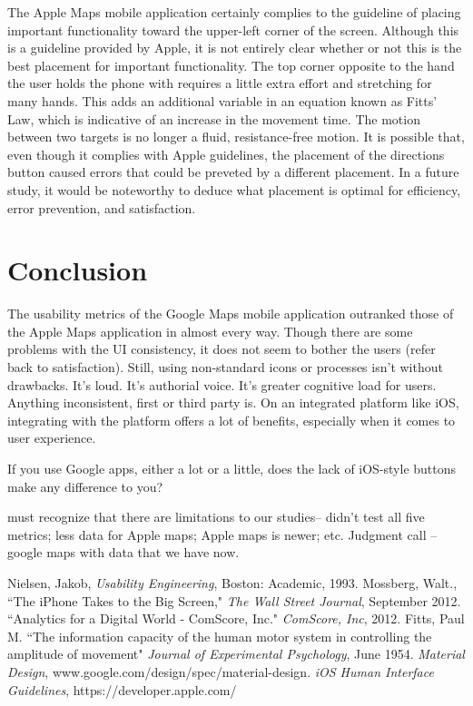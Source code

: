 \documentclass[a4paper; 11pt]{article}
\begin{document}
\par
The Apple Maps mobile application certainly complies to the guideline of placing important functionality toward the upper-left corner of the screen. Although this is a guideline provided by Apple, it is not entirely clear whether or not this is the best placement for important functionality. The top corner opposite to the hand the user holds the phone with requires a little extra effort and stretching for many hands. This adds an additional variable in an equation known as Fitts' Law\cite{Fitts}, which is indicative of an increase in the movement time. The motion between two targets is no longer a fluid, resistance-free motion. It is possible that, even though it complies with Apple guidelines, the placement of the directions button caused errors that could be preveted by a different placement. In a future study, it would be noteworthy to deduce what placement is optimal for efficiency, error prevention, and satisfaction.
\clearpage
\section{Conclusion}
The usability metrics of the Google Maps mobile application outranked those of the Apple Maps application in almost every way. Though there are some problems with the UI consistency, it does not seem to bother the users (refer back to satisfaction). Still, using non-standard icons or processes isn't without drawbacks. It's loud. It's authorial voice. It's greater cognitive load for users. Anything inconsistent, first or third party is. On an integrated platform like iOS, integrating with the platform offers a lot of benefits, especially when it comes to user experience.

If you use Google apps, either a lot or a little, does the lack of iOS-style buttons make any difference to you?

must recognize that there are limitations to our studies-- didn't test all five metrics; less data for Apple maps; Apple maps is newer; etc.
Judgment call -- google maps with data that we have now.
\clearpage
\begin{thebibliography}{100} %
 Nielsen, Jakob, \emph{Usability Engineering}, Boston: Academic, 1993.
 Mossberg, Walt., ``The iPhone Takes to the Big Screen," \emph{The Wall Street Journal}, September 2012.
``Analytics for a Digital World - ComScore, Inc." \emph{ComScore, Inc}, 2012.
Fitts, Paul M. ``The information capacity of the human motor system in controlling the amplitude of movement" \emph{Journal of Experimental Psychology}, June 1954.
 \emph{Material Design}, www.google.com/design/spec/material-design.
 \emph{iOS Human Interface Guidelines}, https://developer.apple.com/
\end{thebibliography}
\end{document}
